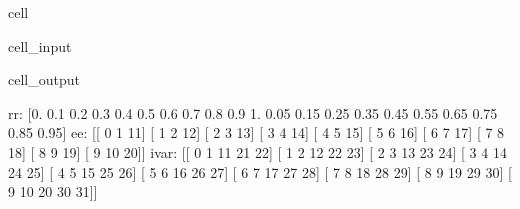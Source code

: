 \documentclass[letterpaper,10pt,english]{jupyterBook}
\begin{document}
\begin{sphinxuseclass}{cell}
\begin{sphinxVerbatimInput}
\begin{sphinxuseclass}{cell_input}
\begin{sphinxVerbatim}[commandchars=\\\{\}]
\end{sphinxVerbatim}

\end{sphinxuseclass}\end{sphinxVerbatimInput}
\begin{sphinxVerbatimOutput}

\begin{sphinxuseclass}{cell_output}
\begin{sphinxVerbatim}[commandchars=\\\{\}]
rr:
 [0.   0.1  0.2  0.3  0.4  0.5  0.6  0.7  0.8  0.9  1.   0.05 0.15 0.25
 0.35 0.45 0.55 0.65 0.75 0.85 0.95]
ee:
 [[ 0  1 11]
 [ 1  2 12]
 [ 2  3 13]
 [ 3  4 14]
 [ 4  5 15]
 [ 5  6 16]
 [ 6  7 17]
 [ 7  8 18]
 [ 8  9 19]
 [ 9 10 20]]
i\PYGZus{}var: 
 [[ 0  1 11 21 22]
 [ 1  2 12 22 23]
 [ 2  3 13 23 24]
 [ 3  4 14 24 25]
 [ 4  5 15 25 26]
 [ 5  6 16 26 27]
 [ 6  7 17 27 28]
 [ 7  8 18 28 29]
 [ 8  9 19 29 30]
 [ 9 10 20 30 31]]
\end{sphinxVerbatim}

\end{sphinxuseclass}\end{sphinxVerbatimOutput}

\end{sphinxuseclass}
\end{document}
